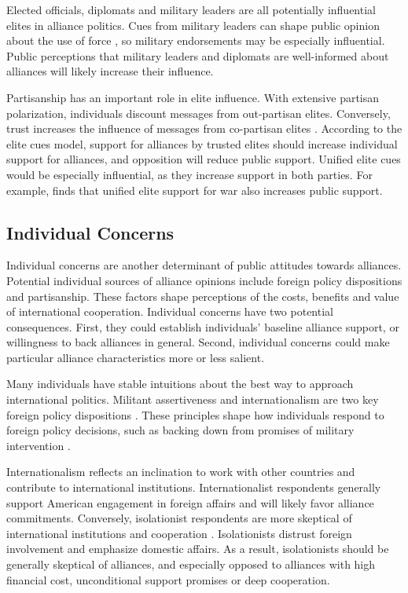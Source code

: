 \documentclass[12pt]{article}
\begin{document}
Elected officials, diplomats and military leaders are all potentially influential elites in alliance politics. 
Cues from military leaders can shape public opinion about the use of force \citep{Golbyetal2018}, so military endorsements may be especially influential. 
Public perceptions that military leaders and diplomats are well-informed about alliances will likely increase their influence. 


Partisanship has an important role in elite influence.
With extensive partisan polarization, individuals discount messages from out-partisan elites. 
Conversely, trust increases the influence of messages from co-partisan elites \citep{Druckmanetal2013}. 
According to the elite cues model, support for alliances by trusted elites should increase individual support for alliances, and opposition will reduce public support.  
Unified elite cues would be especially influential, as they increase support in both parties.
For example, \citet{Berinsky2007} finds that unified elite support for war also increases public support. 



\subsection{Individual Concerns}


Individual concerns are another determinant of public attitudes towards alliances. 
Potential individual sources of alliance opinions include foreign policy dispositions and partisanship. 
These factors shape perceptions of the costs, benefits and value of international cooperation. 
Individual concerns have two potential consequences. 
First, they could establish individuals' baseline alliance support, or willingness to back alliances in general. 
Second, individual concerns could make particular alliance characteristics more or less salient. 


Many individuals have stable intuitions about the best way to approach international politics. 
Militant assertiveness and internationalism are two key foreign policy dispositions \citep{Herrmannetal1999}.  
These principles shape how individuals respond to foreign policy decisions, such as backing down from promises of military intervention \citep{KertzerBrutger2016}. 


Internationalism reflects an inclination to work with other countries and contribute to international institutions. 
Internationalist respondents generally support American engagement in foreign affairs and will likely favor alliance commitments. 
Conversely, isolationist respondents are more skeptical of international institutions and cooperation \citep{Kertzer2013}. 
Isolationists distrust foreign involvement and emphasize domestic affairs. 
As a result, isolationists should be generally skeptical of alliances, and especially opposed to alliances with high financial cost, unconditional support promises or deep cooperation. 
\end{document}
